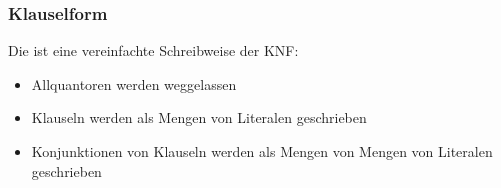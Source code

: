 \documentclass[aspectratio=1610,onlymath]{beamer}
\begin{document}
\begin{frame}\frametitle{Klauselform}

Die  ist eine vereinfachte Schreibweise der KNF:
\begin{itemize}
\item Allquantoren werden weggelassen
\item Klauseln werden als Mengen von Literalen geschrieben
\item Konjunktionen von Klauseln werden als Mengen von Mengen von Literalen geschrieben
\end{itemize}


\end{frame}

\end{document}
